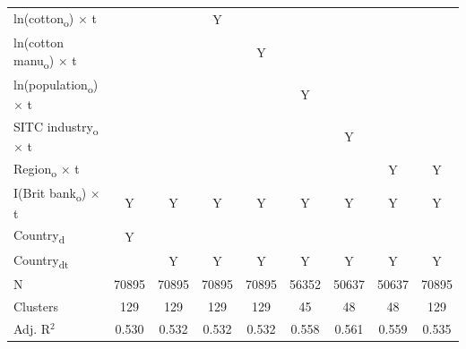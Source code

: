 {\begin{tabular}{l*{8}{c}}
ln(cotton\textsubscript{o}) $\times$ t&               &               &           Y   &               &               &               &               &               \\
ln(cotton manu\textsubscript{o}) $\times$ t&               &               &               &           Y   &               &               &               &               \\
ln(population\textsubscript{o}) $\times$ t&               &               &               &               &           Y   &               &               &               \\
SITC industry\textsubscript{o} $\times$ t&               &               &               &               &               &           Y   &               &               \\
Region\textsubscript{o} $\times$ t&               &               &               &               &               &               &           Y   &           Y   \\
I(Brit bank\textsubscript{o}) $\times$ t&           Y   &           Y   &           Y   &           Y   &           Y   &           Y   &           Y   &           Y   \\
Country\textsubscript{d}&           Y   &               &               &               &               &               &               &               \\
Country\textsubscript{dt}&               &           Y   &           Y   &           Y   &           Y   &           Y   &           Y   &           Y   \\
\midrule
N           &       70895   &       70895   &       70895   &       70895   &       56352   &       50637   &       50637   &       70895   \\
Clusters    &         129   &         129   &         129   &         129   &          45   &          48   &          48   &         129   \\
Adj. R{$^2$}&       0.530   &       0.532   &       0.532   &       0.532   &       0.558   &       0.561   &       0.559   &       0.535   \\
\bottomrule
\end{tabular}
}
